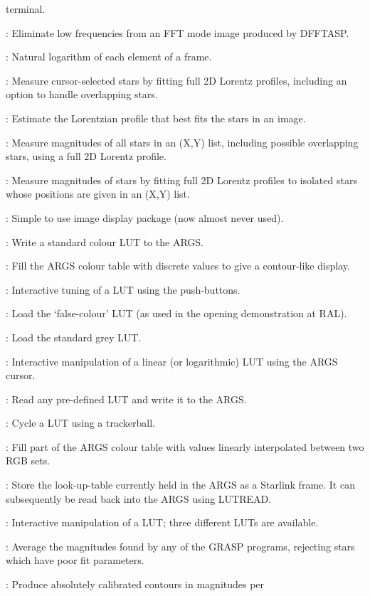 \begin{description}
terminal.
\item [LOFREQ*]: Eliminate low frequencies from an FFT mode image produced by
DFFTASP.
\item [LOG]: Natural logarithm of each element of a frame.
\item [LORCUR]: Measure cursor-selected stars by fitting full 2D Lorentz
profiles, including an option to handle overlapping stars.
\item [LORFIT]: Estimate the Lorentzian profile that best fits the stars in an
image.
\item [LORMUL]: Measure magnitudes of all stars in an (X,Y) list, including
possible overlapping stars, using a full 2D Lorentz profile.
\item [LORSIM]: Measure magnitudes of stars by fitting full 2D Lorentz profiles
to isolated stars whose positions are given in an (X,Y) list.
\item [LSEE]: Simple to use image display package (now almost never used).
\item [LUTCOL]: Write a standard colour LUT to the ARGS.
\item [LUTCONT]: Fill the ARGS colour table with discrete values to give a
contour-like display.
\item [LUTE]: Interactive tuning of a LUT using the push-buttons.
\item [LUTFC]: Load the `false-colour' LUT (as used in the opening
demonstration at RAL).
\item [LUTGREY]: Load the standard grey LUT.
\item [LUTLIN]: Interactive manipulation of a linear (or logarithmic) LUT using
the ARGS cursor.
\item [LUTREAD]: Read any pre-defined LUT and write it to the ARGS.
\item [LUTROT]: Cycle a LUT using a trackerball.
\item [LUTSET]: Fill part of the ARGS colour table with values linearly
interpolated between two RGB sets.
\item [LUTSTORE]: Store the look-up-table currently held in the ARGS as a
Starlink frame.
It can subsequently be read back into the ARGS using LUTREAD.
\item [LUTTWEAK]: Interactive manipulation of a LUT; three different LUTs are
available.
\item [MAGAV]: Average the magnitudes found by any of the GRASP programs,
rejecting stars which have poor fit parameters.
\item [MAGCNTASP]: Produce absolutely calibrated contours in magnitudes per

\end{description}
